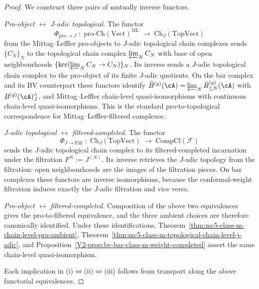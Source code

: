 \begin{proof}
We construct three pairs of mutually inverse functors.

\emph{Pro-object $\leftrightarrow$ $J$-adic topological.} The functor
\[
\Phi_{\mathrm{pro}\to J}
\;\colon\;
\mathrm{pro}\text{-}\mathrm{Ch}(\mathrm{Vect})^{\mathrm{ML}}
\;\longrightarrow\;
\mathrm{Ch}_J(\mathrm{TopVect})
\]
from the Mittag--Leffler pro-objects to $J$-adic topological chain
complexes sends $\{C_N\}_N$ to the topological chain complex
$\varprojlim_N C_N$ with base of open neighbourhoods
$\{\ker(\varprojlim_N C_N \to C_N)\}_N$. Its inverse sends a $J$-adic
topological chain complex to the pro-object of its finite $J$-adic
quotients. On the bar complex and its BV counterpart these functors
identify $\widehat{B}^{(g)}(\cA) =
\varprojlim_N \bar B^{(g)}_{\leq N}(\cA)$
with $B^{(g)}(\cA)^{\wedge}_J$, and Mittag--Leffler chain-level
quasi-isomorphisms with continuous chain-level quasi-isomorphisms. This
is the standard pro-to-topological correspondence for
Mittag--Leffler-filtered complexes.

\emph{$J$-adic topological $\leftrightarrow$ filtered-completed.} The
functor
\[
\Phi_{J \to \mathrm{Filt}}
\;\colon\;
\mathrm{Ch}_J(\mathrm{TopVect})
\;\longrightarrow\;
\mathrm{CompCl}(\mathcal{F})
\]
sends the $J$-adic topological chain complex to its filtered-completed
incarnation under the filtration $F^N := J^{(N)}$. Its inverse retrieves
the $J$-adic topology from the filtration: open neighbourhoods are the
images of the filtration pieces. On bar complexes these functors are
inverse isomorphisms, because the conformal-weight filtration induces
exactly the $J$-adic filtration and vice versa.

\emph{Pro-object $\leftrightarrow$ filtered-completed.} Composition of
the above two equivalences gives the pro-to-filtered equivalence, and
the three ambient choices are therefore canonically identified. Under
these identifications, Theorem~\ref{thm:mc5-class-m-chain-level-pro-ambient},
Theorem~\ref{thm:mc5-class-m-topological-chain-level-j-adic}, and
Proposition~\ref{V2-prop:bv-bar-class-m-weight-completed} assert the same
chain-level quasi-isomorphism.

Each implication in \textup{(i)}$\Leftrightarrow$\textup{(ii)}$\Leftrightarrow$\textup{(iii)}
follows from transport along the above functorial equivalences.
\end{proof}

